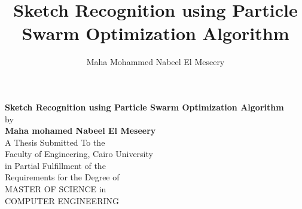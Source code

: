 \documentclass[11pt,doublespace]{Sketchthesis}
\begin{document}
\title{Sketch Recognition using Particle Swarm Optimization Algorithm}             %
\author{Maha Mohammed Nabeel El Meseery}                               %
\degreemonth{}                                      %
\degreeyear{}                                      %
\maketitle

\providecommand{\tabularnewline}{\\}
\thispagestyle{empty}               %
\newpage                                                             
\begin{center}     
\LARGE  
\textbf{Sketch Recognition using Particle Swarm Optimization Algorithm}\\
\normalsize by      \\ 
\Large  \textbf{ Maha mohamed Nabeel El Meseery}\\
\vspace*{0.4in}        
\normalsize
A Thesis Submitted To the\\
Faculty of Engineering, Cairo University\\
in Partial Fulfillment of the\\
Requirements for the Degree of\\
MASTER OF SCIENCE
in\\
COMPUTER ENGINEERING\\

\end{center}
          
\end{document}
